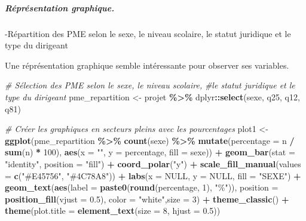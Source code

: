 \documentclass[
]{article}
\newenvironment{Shaded}{\begin{snugshade}}{\end{snugshade}}
\newcommand{\AttributeTok}[1]{\textcolor[rgb]{0.13,0.29,0.53}{#1}}
\newcommand{\CommentTok}[1]{\textcolor[rgb]{0.56,0.35,0.01}{\textit{#1}}}
\newcommand{\ConstantTok}[1]{\textcolor[rgb]{0.56,0.35,0.01}{#1}}
\newcommand{\DecValTok}[1]{\textcolor[rgb]{0.00,0.00,0.81}{#1}}
\newcommand{\FloatTok}[1]{\textcolor[rgb]{0.00,0.00,0.81}{#1}}
\newcommand{\FunctionTok}[1]{\textcolor[rgb]{0.13,0.29,0.53}{\textbf{#1}}}
\newcommand{\NormalTok}[1]{#1}
\newcommand{\OtherTok}[1]{\textcolor[rgb]{0.56,0.35,0.01}{#1}}
\newcommand{\SpecialCharTok}[1]{\textcolor[rgb]{0.81,0.36,0.00}{\textbf{#1}}}
\newcommand{\StringTok}[1]{\textcolor[rgb]{0.31,0.60,0.02}{#1}}
\begin{document}
\hfill\break

\hypertarget{ruxe9pruxe9sentation-graphique.}{%
\subparagraph{Réprésentation
graphique.}\label{ruxe9pruxe9sentation-graphique.}}

\hfill\break

-Répartition des PME selon le sexe, le niveau scolaire, le statut
juridique et le type du dirigeant

\hfill\break
Une réprésentation graphique semble intéressante pour observer ses
variables.\\

\begin{Shaded}
\begin{Highlighting}[]
\CommentTok{\# Sélection des PME selon le sexe, le niveau scolaire,}
\CommentTok{\#le statut juridique et le type du dirigeant}
\NormalTok{pme\_repartition }\OtherTok{\textless{}{-}}\NormalTok{ projet }\SpecialCharTok{\%\textgreater{}\%}
\NormalTok{  dplyr}\SpecialCharTok{::}\FunctionTok{select}\NormalTok{(sexe, q25, q12, q81)}

\CommentTok{\# Créer les graphiques en secteurs pleins avec les pourcentages}
\NormalTok{plot1 }\OtherTok{\textless{}{-}} \FunctionTok{ggplot}\NormalTok{(pme\_repartition }\SpecialCharTok{\%\textgreater{}\%}
                 \FunctionTok{count}\NormalTok{(sexe) }\SpecialCharTok{\%\textgreater{}\%}
                 \FunctionTok{mutate}\NormalTok{(}\AttributeTok{percentage =}\NormalTok{ n }\SpecialCharTok{/} \FunctionTok{sum}\NormalTok{(n) }\SpecialCharTok{*} \DecValTok{100}\NormalTok{), }
                \FunctionTok{aes}\NormalTok{(}\AttributeTok{x =} \StringTok{""}\NormalTok{, }\AttributeTok{y =}\NormalTok{ percentage, }\AttributeTok{fill =}\NormalTok{ sexe)) }\SpecialCharTok{+}
  \FunctionTok{geom\_bar}\NormalTok{(}\AttributeTok{stat =} \StringTok{"identity"}\NormalTok{, }\AttributeTok{position =} \StringTok{"fill"}\NormalTok{) }\SpecialCharTok{+}
  \FunctionTok{coord\_polar}\NormalTok{(}\StringTok{"y"}\NormalTok{) }\SpecialCharTok{+}
  \FunctionTok{scale\_fill\_manual}\NormalTok{(}\AttributeTok{values =} \FunctionTok{c}\NormalTok{(}\StringTok{"\#E45756"}\NormalTok{, }\StringTok{"\#4C78A8"}\NormalTok{)) }\SpecialCharTok{+}
  \FunctionTok{labs}\NormalTok{(}\AttributeTok{x =} \ConstantTok{NULL}\NormalTok{, }\AttributeTok{y =} \ConstantTok{NULL}\NormalTok{, }\AttributeTok{fill =} \StringTok{"SEXE"}\NormalTok{) }\SpecialCharTok{+}
  \FunctionTok{geom\_text}\NormalTok{(}\FunctionTok{aes}\NormalTok{(}\AttributeTok{label =} \FunctionTok{paste0}\NormalTok{(}\FunctionTok{round}\NormalTok{(percentage, }\DecValTok{1}\NormalTok{), }\StringTok{"\%"}\NormalTok{)), }
            \AttributeTok{position =} \FunctionTok{position\_fill}\NormalTok{(}\AttributeTok{vjust =} \FloatTok{0.5}\NormalTok{), }\AttributeTok{color =} \StringTok{"white"}\NormalTok{,}\AttributeTok{size =} \DecValTok{3}\NormalTok{) }\SpecialCharTok{+}
  \FunctionTok{theme\_classic}\NormalTok{() }\SpecialCharTok{+}
  \FunctionTok{theme}\NormalTok{(}\AttributeTok{plot.title =} \FunctionTok{element\_text}\NormalTok{(}\AttributeTok{size =} \DecValTok{8}\NormalTok{, }\AttributeTok{hjust =} \FloatTok{0.5}\NormalTok{)) }



\end{Highlighting}
\end{Shaded}
\end{document}
